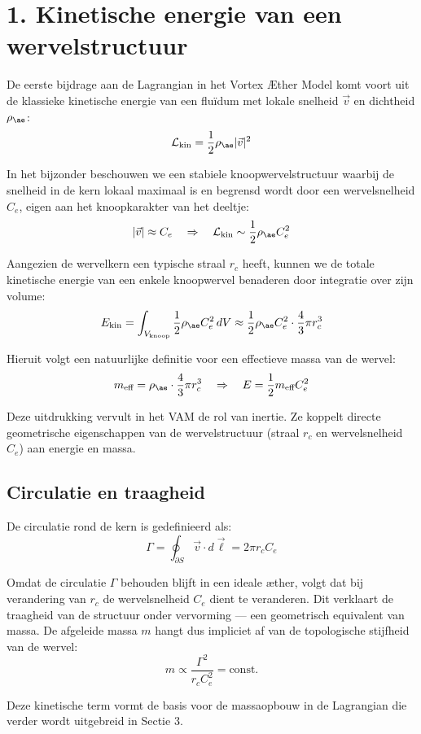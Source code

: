 \section*{1. Kinetische energie van een wervelstructuur}

De eerste bijdrage aan de Lagrangian in het Vortex Æther Model komt voort uit de klassieke kinetische energie van een fluïdum met lokale snelheid $\vec{v}$ en dichtheid $\rho_{\ae}$:
\[
    \mathcal{L}_{\text{kin}} = \frac{1}{2} \rho_{\ae} |\vec{v}|^2
\]

In het bijzonder beschouwen we een stabiele knoopwervelstructuur waarbij de snelheid in de kern lokaal maximaal is en begrensd wordt door een wervelsnelheid $C_e$, eigen aan het knoopkarakter van het deeltje:
\[
    |\vec{v}| \approx C_e \quad \Rightarrow \quad \mathcal{L}_{\text{kin}} \sim \frac{1}{2} \rho_{\ae} C_e^2
\]

Aangezien de wervelkern een typische straal $r_c$ heeft, kunnen we de totale kinetische energie van een enkele knoopwervel benaderen door integratie over zijn volume:
\[
    E_{\text{kin}} = \int_{V_{\text{knoop}}} \frac{1}{2} \rho_{\ae} C_e^2 \, dV \approx \frac{1}{2} \rho_{\ae} C_e^2 \cdot \frac{4}{3}\pi r_c^3
\]

Hieruit volgt een natuurlijke definitie voor een effectieve massa van de wervel:
\[
    m_\text{eff} = \rho_{\ae} \cdot \frac{4}{3}\pi r_c^3
    \quad \Rightarrow \quad E = \frac{1}{2} m_\text{eff} C_e^2
\]

Deze uitdrukking vervult in het VAM de rol van inertie. Ze koppelt directe geometrische eigenschappen van de wervelstructuur (straal $r_c$ en wervelsnelheid $C_e$) aan energie en massa.

\subsection*{Circulatie en traagheid}
De circulatie rond de kern is gedefinieerd als:
\[
    \Gamma = \oint_{\partial S} \vec{v} \cdot d\vec{\ell} = 2\pi r_c C_e
\]

Omdat de circulatie $\Gamma$ behouden blijft in een ideale æther, volgt dat bij verandering van $r_c$ de wervelsnelheid $C_e$ dient te veranderen. Dit verklaart de traagheid van de structuur onder vervorming — een geometrisch equivalent van massa. De afgeleide massa $m$ hangt dus impliciet af van de topologische stijfheid van de wervel:
\[
    m \propto \frac{\Gamma^2}{r_c C_e^2} = \text{const.}
\]

Deze kinetische term vormt de basis voor de massaopbouw in de Lagrangian die verder wordt uitgebreid in Sectie 3.